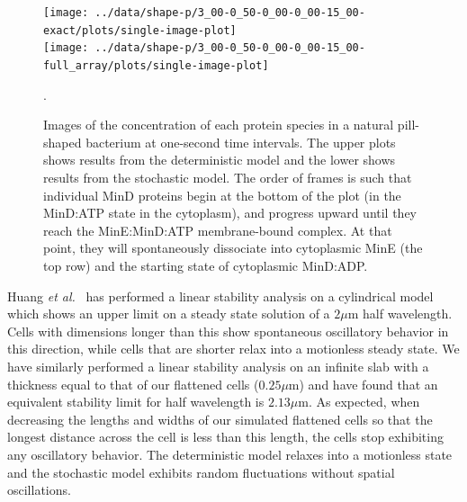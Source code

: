 \documentclass[10pt,letterpaper]{article}
\newcommand\micron{\ensuremath{\mu\text{m}}}
\begin{document}
\begin{figure}
  \begin{center}
    \texttt{[image: ../data/shape-p/3\_00-0\_50-0\_00-0\_00-15\_00-exact/plots/single-image-plot]}\\
    \vspace{-1.5em}
    \texttt{[image: ../data/shape-p/3\_00-0\_50-0\_00-0\_00-15\_00-full\_array/plots/single-image-plot]}
    \vspace{-1.5em}
  \end{center}
  \caption{Images of the concentration of each protein species in a
    natural pill-shaped bacterium at one-second time intervals. The
    upper plots shows results from the deterministic model and the
    lower shows results from the stochastic model.  The order of
    frames is such that individual MinD proteins begin at the bottom
    of the plot (in the MinD:ATP state in the cytoplasm), and progress
    upward until they reach the MinE:MinD:ATP membrane-bound complex.
    At that point, they will spontaneously dissociate into cytoplasmic
    MinE (the top row) and the starting state of cytoplasmic
    MinD:ADP.}.
  \label{image-p}
\end{figure}

Huang \emph{et al.}~\cite{huang2003dynamic} has performed a linear
stability analysis on a cylindrical model which shows an upper limit
on a steady state solution of a $2\micron$ half wavelength.  Cells
with dimensions longer than this show spontaneous oscillatory behavior
in this direction, while cells that are shorter relax into a
motionless steady state.  We have similarly performed a linear
stability analysis on an infinite slab with a thickness equal to that
of our flattened cells ($0.25\micron$) and have found that an
equivalent stability limit for half wavelength is $2.13\micron$. As
expected, when decreasing the lengths and widths of our simulated
flattened cells so that the longest distance across the cell is less
than this length, the cells stop exhibiting any oscillatory behavior.
The deterministic model relaxes into a motionless state and the
stochastic model exhibits random fluctuations without spatial
oscillations.



\end{document}
